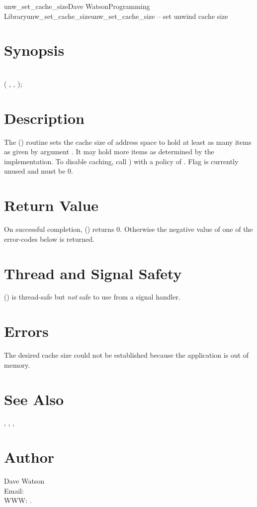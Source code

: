 \documentclass{article}
\begin{document}
\begin{Name}{3}{unw\_set\_cache\_size}{Dave Watson}{Programming Library}{unw\_set\_cache\_size}unw\_set\_cache\_size -- set unwind cache size
\end{Name}

\section{Synopsis}

\\

 ( ,  ,  );\\

\section{Description}

The () routine sets the cache size of
address space  to hold at least as many items as given by
argument .  It may hold more items as determined by the
implementation.  To disable caching, call
) with a policy of
.  Flag is currently unused and must be 0.

\section{Return Value}

On successful completion, () returns 0.
Otherwise the negative value of one of the error-codes below is
returned.

\section{Thread and Signal Safety}

() is thread-safe but \emph{not} safe
to use from a signal handler.

\section{Errors}

\begin{Description}
\item[\Const{UNW\_ENOMEM}] The desired cache size could not be
  established because the application is out of memory.
\end{Description}

\section{See Also}

,
,
,

\section{Author}

\noindent
Dave Watson\\
Email: \\
WWW: .
\LatexManEnd
\end{document}

